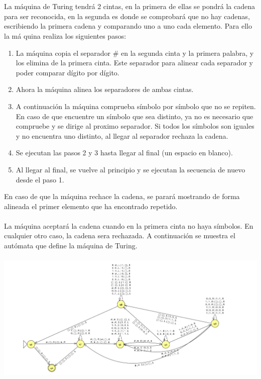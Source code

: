 \documentclass[11pt, a4paper]{exam}
\begin{document}
\begin{questions}
\begin{parts}
\begin{solution}
            \\
            \\
            La máquina de Turing tendrá 2 cintas, en la primera de ellas se pondrá la cadena para ser reconocida, en la segunda es donde se comprobará que no hay cadenas, escribiendo la primera cadena y comparando uno a uno cada elemento. Para ello la má
            quina realiza los siguientes pasos:
            \begin{enumerate}
                \item La máquina copia el separador $\#$ en la segunda cinta y la primera palabra, y los elimina de la primera cinta. Este separador para alinear cada separador y poder comparar dígito por dígito.
                \item Ahora la máquina alinea los separadores de ambas cintas.
                \item A continuación la máquina comprueba símbolo por símbolo que no se repiten. En caso de que encuentre un símbolo que sea distinto, ya no es necesario que compruebe y se dirige al proximo separador. Si todos los símbolos son iguales y no encuentra uno distinto, al llegar al separador rechaza la cadena.
                \item Se ejecutan las pasos 2 y 3 hasta llegar al final (un espacio en blanco).
                \item Al llegar al final, se vuelve al principio y se ejecutan la secuencia de nuevo desde el paso 1.
            \end{enumerate}
            En caso de que la máquina rechace la cadena, se parará mostrando de forma alineada el primer elemento que ha encontrado repetido.
            \\
            \\
            La máquina aceptará la cadena cuando en la primera cinta no haya símbolos. En cualquier otro caso, la cadena sera rechazada.
            A continuación se muestra el autómata que define la máquina de Turing. 
            \\
            \\
            \includegraphics[width = 16 cm]{figs/M4Multicinta.png}

\end{solution}
\end{parts}
\end{questions}
\end{document}
